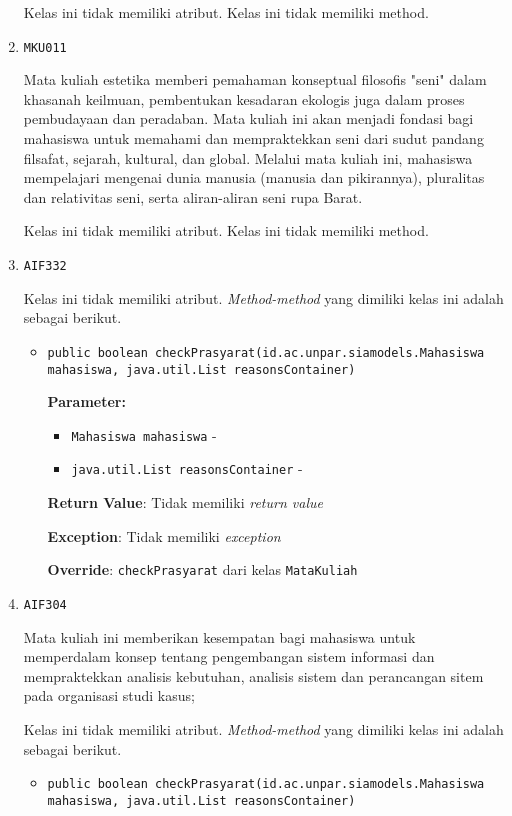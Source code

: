 \documentclass{article}
\begin{document}
\begin{enumerate}
Kelas ini tidak memiliki atribut. Kelas ini tidak memiliki method. \item \texttt{MKU011}

Mata kuliah estetika memberi pemahaman konseptual filosofis "seni" dalam khasanah keilmuan, 
 pembentukan kesadaran ekologis juga dalam proses pembudayaan dan peradaban. Mata kuliah ini 
 akan menjadi fondasi bagi mahasiswa untuk memahami dan mempraktekkan seni dari sudut pandang
 filsafat, sejarah, kultural, dan global. Melalui mata kuliah ini, mahasiswa mempelajari
 mengenai dunia manusia (manusia dan pikirannya), pluralitas dan relativitas seni, serta 
 aliran-aliran seni rupa Barat.

Kelas ini tidak memiliki atribut. Kelas ini tidak memiliki method. \item \texttt{AIF332}



Kelas ini tidak memiliki atribut. \textit{Method-method} yang dimiliki kelas ini adalah sebagai berikut.
\begin{itemize}
\item \texttt{public boolean checkPrasyarat(id.ac.unpar.siamodels.Mahasiswa mahasiswa, java.util.List reasonsContainer)}

\textbf{Parameter:}
\begin{itemize}
\item \texttt{Mahasiswa mahasiswa} - 
\item \texttt{java.util.List reasonsContainer} - 
\end{itemize}
\textbf{Return Value}: Tidak memiliki \textit{return value}

\textbf{Exception}: Tidak memiliki \textit{exception}

\textbf{Override}: \texttt{checkPrasyarat} dari kelas \texttt{MataKuliah}

\end{itemize}
\item \texttt{AIF304}

Mata kuliah ini memberikan kesempatan bagi mahasiswa untuk memperdalam konsep
 tentang pengembangan sistem informasi dan mempraktekkan analisis kebutuhan,
 analisis sistem dan perancangan sitem pada organisasi studi kasus;

Kelas ini tidak memiliki atribut. \textit{Method-method} yang dimiliki kelas ini adalah sebagai berikut.
\begin{itemize}
\item \texttt{public boolean checkPrasyarat(id.ac.unpar.siamodels.Mahasiswa mahasiswa, java.util.List reasonsContainer)}


\end{itemize}
\end{enumerate}
\end{document}
